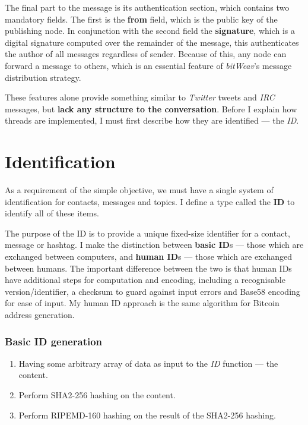 \documentclass[10pt,a4paper,onecolumn]{article}
\begin{document}
The final part to the message is its authentication section, which contains two mandatory fields. The first is the \textbf{from} field, which is the public key of the publishing node. In conjunction with the second field the \textbf{signature}, which is a digital signature computed over the remainder of the message, this authenticates the author of all messages regardless of sender. Because of this, any node can forward a message to others, which is an essential feature of \textit{bitWeav}'s message distribution strategy.

These features alone provide something similar to \textit{Twitter} tweets and \textit{IRC} messages, but \textbf{lack any structure to the conversation}. Before I explain how threads are implemented, I must first describe how they are identified — the \emph{ID}.

\section{Identification}
\label{id}
As a requirement of the simple objective, we must have a single system of identification for contacts, messages and topics. I define a type called the \textbf{ID} to identify all of these items. 

The purpose of the ID is to provide a unique fixed-size identifier for a contact, message or hashtag. I make the distinction between \textbf{basic ID}s — those which are exchanged between computers, and \textbf{human ID}s — those which are exchanged between humans. The important difference between the two is that human IDs have additional steps for computation and encoding, including a recognisable version/identifier, a checksum to guard against input errors and Base58 encoding for ease of input. My human ID approach is the same algorithm for Bitcoin address generation\cite{btcAddr}. 

\subsubsection*{Basic ID generation}
\begin{enumerate}
\item Having some arbitrary array of data as input to the \emph{ID} function — the content.
\item Perform SHA2-256 hashing on the content.
\item Perform RIPEMD-160 hashing on the result of the SHA2-256 hashing.
\end{enumerate}
\end{document}
